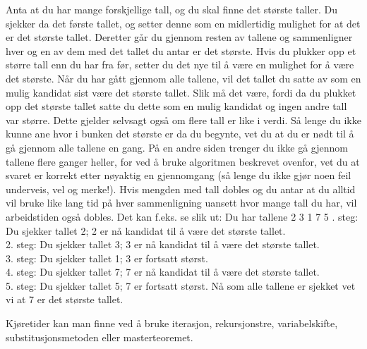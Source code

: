 \begin{boxed}
Anta at du har mange forskjellige tall, og du skal finne det største taller. Du sjekker da det første tallet, og setter denne som en midlertidig mulighet for at det er det største tallet. Deretter går du gjennom resten av tallene og sammenligner hver og en av dem med det tallet du antar er det største. Hvis du plukker opp et større tall enn du har fra før, setter du det nye til å være en mulighet for å være det største. Når du har gått gjennom alle tallene, vil det tallet du satte av som en mulig kandidat sist være det største tallet. Slik må det være, fordi da du plukket opp det største tallet satte du dette som en mulig kandidat og ingen andre tall var større. Dette gjelder selvsagt også om flere tall er like i verdi. Så lenge du ikke kunne ane hvor i bunken det største er da du begynte, vet du at du er nødt til å gå gjennom alle tallene en gang.
\newline \newline
På en andre siden trenger du ikke gå gjennom tallene flere ganger heller, for ved å bruke algoritmen beskrevet ovenfor, vet du at svaret er korrekt etter nøyaktig en gjennomgang (så lenge du ikke gjør noen feil underveis, vel og merke!). Hvis mengden med tall dobles og du antar at du alltid vil bruke like lang tid på hver sammenligning uansett hvor mange tall du har, vil arbeidstiden også dobles. Det kan f.eks. se slik ut:
\newline \newline
Du har tallene 2 3 1 7 5
\newline {}. steg: Du sjekker tallet 2; 2 er nå kandidat til å være det største tallet.\\
2. steg: Du sjekker tallet 3; 3 er nå kandidat til å være det største tallet.\\
3. steg: Du sjekker tallet 1; 3 er fortsatt størst.\\
4. steg: Du sjekker tallet 7; 7 er nå kandidat til å være det største tallet.\\
5. steg: Du sjekker tallet 5; 7 er fortsatt størst.
\newline \newline
Nå som alle tallene er sjekket vet vi at 7 er det største tallet.
\end{boxed}

\noindent Kjøretider kan man finne ved å bruke iterasjon, rekursjonstre, variabelskifte, substitusjonsmetoden eller masterteoremet.

